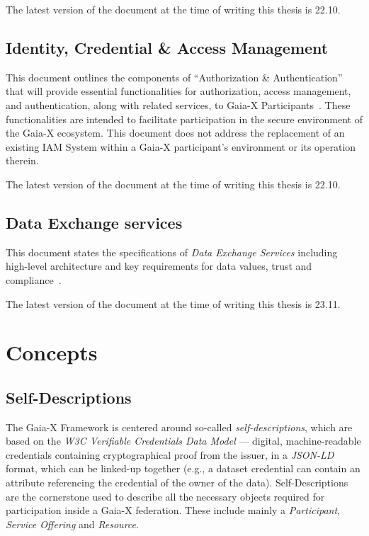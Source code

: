 The latest version of the document at the time of writing this thesis is 22.10.

\subsection{Identity, Credential \& Access Management}\label{subsec:identity-credential-&-access-management}

This document outlines the components of ``Authorization \& Authentication'' that will provide essential functionalities for authorization, access management, and authentication, along with related services, to Gaia-X Participants~\cite{gaiax_identity_and_access_management}.
These functionalities are intended to facilitate participation in the secure environment of the Gaia-X ecosystem.
This document does not address the replacement of an existing IAM System within a Gaia-X participant's environment or its operation therein.

The latest version of the document at the time of writing this thesis is 22.10.

\subsection{Data Exchange services}\label{subsec:data-exchange-services}

This document states the specifications of \textit{Data Exchange Services} including high-level architecture and key requirements for data values, trust and compliance~\cite{gaiax_data_exchange_document}.

The latest version of the document at the time of writing this thesis is 23.11.

\section{Concepts}\label{sec:concepts}


\subsection{Self-Descriptions}\label{subsec:self-descriptions}
The Gaia-X Framework is centered around so-called \textit{self-descriptions}, which are based on the \textit{W3C Verifiable Credentials Data Model} --- digital, machine-readable credentials containing cryptographical proof from the issuer, in a \textit{JSON-LD} format, which can be linked-up together (e.g., a dataset credential can contain an attribute referencing the credential of the owner of the data).
Self-Descriptions are the cornerstone used to describe all the necessary objects required for participation inside a Gaia-X federation.
These include mainly a \textit{Participant}, \textit{Service Offering} and \textit{Resource}.

